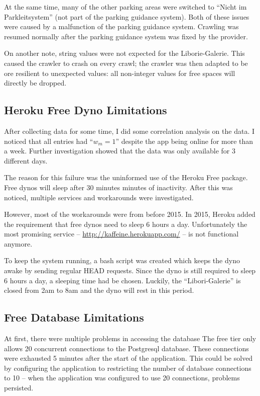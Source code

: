 \documentclass[journal,10pt]{IEEEtran}
\newcommand{\wom}{w_m}
\begin{document}
At the same time, many of the other parking areas were switched to ``Nicht im Parkleitsystem'' (not part of the parking guidance system). Both of these issues were caused by a malfunction of the parking guidance system. Crawling was resumed normally after the parking guidance system was fixed by the provider.

On another note, string values were not expected for the Liborie-Galerie. This caused the crawler to crash on every crawl; the crawler was then adapted to be ore resilient to unexpected values: all non-integer values for free spaces will directly be dropped.

\subsection{Heroku Free Dyno Limitations}

After collecting data for some time, I did some correlation analysis on the data. I noticed that all entries had ``\(\wom = 1\)'' despite the app being online for more than a week. Further investigation showed that the data was only available for 3 different days. 

The reason for this failure was the uninformed use of the Heroku Free package. Free dynos will sleep after 30 minutes minutes of inactivity. After this was noticed, multiple services and workarounds were investigated.

However, most of the workarounds were from before 2015. In 2015, Heroku added the requirement that free dynos need to sleep 6 hours a day. Unfortunately the most promising service -- \url{http://kaffeine.herokuapp.com/} -- is not functional anymore.

To keep the system running, a bash script was created which keeps the dyno awake by sending regular HEAD requests. Since the dyno is still required to sleep 6 hours a day, a sleeping time had be chosen. Luckily, the ``Libori-Galerie'' is closed from 2am to 8am and the dyno will rest in this period. 

\subsection{Free Database Limitations}
At first, there were multiple problems in accessing the database The free tier only allows 20 concurrent connections to the Postgresql database. These connections were exhausted 5 minutes after the start of the application. This could be solved by configuring the application to restricting the number of database connections to 10 -- when the application was configured to use 20 connections, problems persisted.
\end{document}
